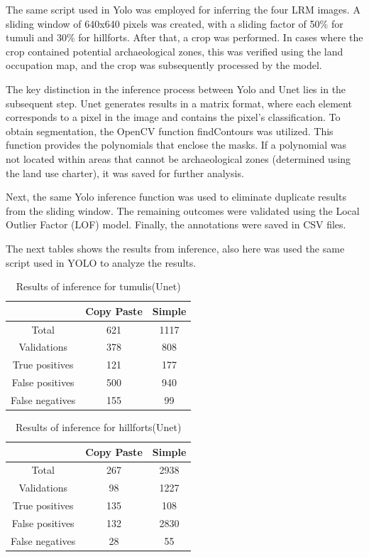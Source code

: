 The same script used in Yolo was employed for inferring the four LRM images. A sliding window of 640x640 pixels was created, with a sliding factor of 50\% for tumuli and 30\% for hillforts. After that, a crop was performed. In cases where the crop contained potential archaeological zones, this was verified using the land occupation map, and the crop was subsequently processed by the model.

The key distinction in the inference process between Yolo and Unet lies in the subsequent step. Unet generates results in a matrix format, where each element corresponds to a pixel in the image and contains the pixel's classification. To obtain segmentation, the OpenCV function findContours was utilized. This function provides the polynomials that enclose the masks. If a polynomial was not located within areas that cannot be archaeological zones (determined using the land use charter), it was saved for further analysis.

Next, the same Yolo inference function was used to eliminate duplicate results from the sliding window. The remaining outcomes were validated using the Local Outlier Factor (LOF) model. Finally, the annotations were saved in CSV files.

The next tables shows the results from inference, also here was used the same script used in YOLO to analyze the results.

\begin{table}[H]
\centering
\begin{tabular}{|c c c|} 
 \hline
  &  Copy Paste & Simple \\ [0.5ex] 
 \hline\hline
 Total & 621 & 1117 \\ 
 Validations & 378 & 808 \\
 True positives & 121 & 177 \\
 False positives & 500 & 940 \\
 False negatives & 155 & 99\\ [1ex] 
 \hline
\end{tabular}
\caption{Results of inference for tumulis(Unet)}
\end{table}

\begin{table}[H]
\centering
\begin{tabular}{|c c c|} 
 \hline
  & Copy Paste & Simple \\ [0.5ex] 
 \hline\hline
 Total & 267 & 2938 \\ 
 Validations & 98 & 1227\\
 True positives & 135 & 108 \\
 False positives & 132 & 2830 \\
 False negatives & 28 & 55\\ [1ex] 
 \hline
\end{tabular}
\caption{Results of inference for hillforts(Unet)}
\end{table}

